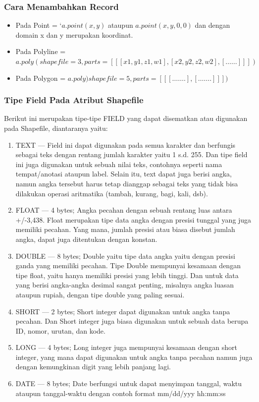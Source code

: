 \subsubsection{Cara Menambahkan Record}
\begin{itemize}
    \item Pada Point = $‘a.point(x,y)$ ataupun $a.point(x,y,0,0)$ dan dengan domain x dan y merupakan koordinat.
    \item Pada Polyline = $a.poly(shapefile=3,parts=[[[x1,y1,z1,w1],[ x2,y2,z2,w2],[……]]])$
    \item Pada Polygon = $a.poly)shapefile=5,parts=[[[…….],[…….]]])$
\end{itemize}

\subsubsection{Tipe Field Pada Atribut Shapefile}
       Berikut ini merupakan tipe-tipe FIELD yang dapat disematkan atau digunakan pada Shapefile, diantaranya yaitu:
\begin{enumerate}
    \item TEXT — Field ini dapat digunakan pada semua karakter dan berfungis sebagai teks dengan rentang jumlah karakter yaitu 1 s.d.              255. Dan tipe field ini juga digunakan untuk sebuah nilai teks, contohnya seperti nama tempat/anotasi ataupun label. Selain              itu, text dapat juga berisi angka, namun angka tersebut harus tetap dianggap sebagai teks yang tidak bisa dilakukan operasi              aritmatika (tambah, kurang, bagi, kali, dsb).
    \item FLOAT — 4 bytes; Angka pecahan dengan sebuah rentang luas antara +/-3,438. Float merupakan tipe data angka dengan presisi                tunggal yang juga memiliki pecahan. Yang mana, jumlah presisi atau biasa disebut jumlah angka, dapat juga ditentukan dengan              konstan.
    \item DOUBLE — 8 bytes; Double yaitu tipe data angka yaitu dengan presisi ganda yang memiliki pecahan. Tipe Double mempunyai                  kesamaan  dengan tipe float, yaitu hanya memiliki presisi yang lebih tinggi. Dan untuk data yang berisi angka-angka desimal              sangat penting, misalnya angka luasan ataupun rupiah, dengan tipe double yang paling sesuai.
    \item SHORT — 2 bytes; Short integer dapat digunakan untuk angka tanpa pecahan. Dan Short integer juga biasa digunakan untuk                   sebuah data berupa ID, nomor, urutan, dan kode.
    \item LONG — 4 bytes; Long integer juga mempunyai kesamaan dengan short integer, yang mana dapat digunakan untuk angka tanpa                  pecahan namun juga  dengan kemungkinan digit yang lebih panjang lagi.
    \item DATE — 8 bytes; Date berfungsi untuk dapat menyimpan tanggal, waktu ataupun tanggal-waktu dengan contoh format mm/dd/yyy                hh:mm:ss
\end{enumerate}

